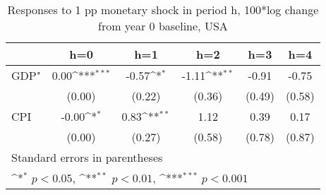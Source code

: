 \begin{table}[htbp]\centering
\def\sym#1{\ifmmode^{#1}\else\(^{#1}\)\fi}
\caption{Responses to 1 pp monetary shock in period h, 100*log change from year 0 baseline, USA}
\begin{tabular}{l*{5}{c}}
\hline\hline
            &\multicolumn{1}{c}{h=0}&\multicolumn{1}{c}{h=1}&\multicolumn{1}{c}{h=2}&\multicolumn{1}{c}{h=3}&\multicolumn{1}{c}{h=4}\\
\hline
GDP"        &        0.00\sym{***}&       -0.57\sym{*}  &       -1.11\sym{**} &       -0.91         &       -0.75         \\
            &      (0.00)         &      (0.22)         &      (0.36)         &      (0.49)         &      (0.58)         \\
[1em]
CPI         &       -0.00\sym{*}  &        0.83\sym{**} &        1.12         &        0.39         &        0.17         \\
            &      (0.00)         &      (0.27)         &      (0.58)         &      (0.78)         &      (0.87)         \\
\hline\hline
\multicolumn{6}{l}{\footnotesize Standard errors in parentheses}\\
\multicolumn{6}{l}{\footnotesize \sym{*} \(p<0.05\), \sym{**} \(p<0.01\), \sym{***} \(p<0.001\)}\\
\end{tabular}
\end{table}
